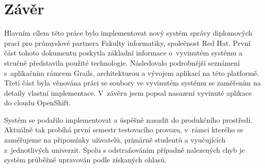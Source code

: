 \chapter{Závěr}
Hlavním cílem této práce bylo implementovat nový systém správy diplomových prací pro průmyslové partnera Fakulty informatiky, společnost Red Hat. První část tohoto dokumentu poskytla základní informace o~vyvinutém systému a stručně představila použité technologie. Následovalo podrobnější seznámení s~aplikačním rámcem Grails, architekturou a vývojem aplikací na této platformě. Třetí část byla věnována práci se soubory ve vyvinutém systému se zaměřením na detaily vlastní implementace. V~závěru jsem popsal nasazení vyvinuté aplikace do cloudu OpenShift.

Systém se podařilo implementovat a úspěšně nasadit do produkčního prostředí. Aktuálně tak probíhá první semestr testovacího provozu, v~rámci kterého se zaměřujeme na připomínky uživatelů, primárně studentů a vyučujících z~jednotlivých univerzit. Spolu s odstraňováním případně nalezených chyb je systém průběžně upravován podle získaných ohlasů.
